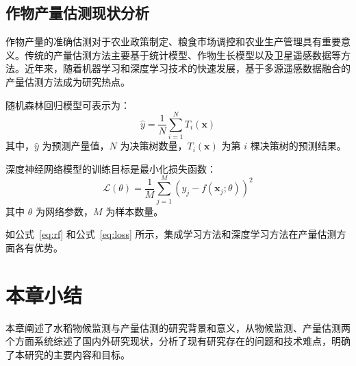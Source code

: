 \subsection{作物产量估测现状分析}
\label{subsec:yield}

作物产量的准确估测对于农业政策制定、粮食市场调控和农业生产管理具有重要意义。传统的产量估测方法主要基于统计模型、作物生长模型以及卫星遥感数据等方法。近年来，随着机器学习和深度学习技术的快速发展，基于多源遥感数据融合的产量估测方法成为研究热点。

随机森林回归模型可表示为：
\begin{equation}
  \label{eq:rf}
  \hat{y} = \frac{1}{N} \sum_{i=1}^{N} T_i(\mathbf{x})
\end{equation}
其中，$\hat{y}$ 为预测产量值，$N$ 为决策树数量，$T_i(\mathbf{x})$ 为第 $i$ 棵决策树的预测结果。

深度神经网络模型的训练目标是最小化损失函数：
\begin{equation}
  \label{eq:loss}
  \mathcal{L}(\theta) = \frac{1}{M} \sum_{j=1}^{M} \left( y_j - f(\mathbf{x}_j; \theta) \right)^2
\end{equation}
其中 $\theta$ 为网络参数，$M$ 为样本数量。

如公式~\eqref{eq:rf} 和公式~\eqref{eq:loss} 所示，集成学习方法和深度学习方法在产量估测方面各有优势。

\section{本章小结}
\label{sec:summary}

本章阐述了水稻物候监测与产量估测的研究背景和意义，从物候监测、产量估测两个方面系统综述了国内外研究现状，分析了现有研究存在的问题和技术难点，明确了本研究的主要内容和目标。
